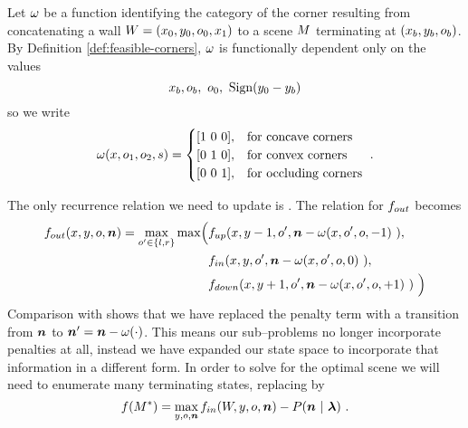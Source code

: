 Let $\CategoryFunc$ be a function identifying the
category of the corner resulting from concatenating a wall
$\Wall=(x_0,y_0,\WallOrient_0,x_1)$ to a scene $\Scene$ terminating at
$(x_b,y_b,\WallOrient_b)$. By Definition \ref{def:feasible-corners},
$\CategoryFunc$ is functionally dependent only on the values
\begin{equation}
  x_b, \WallOrient_b, ~\WallOrient_0, ~\sign(y_0-y_b)
\end{equation}
so we write
\begin{equation}
  \CategoryFunc(x,\WallOrient_1,\WallOrient_2,s) =
  \begin{cases}
    [1 ~ 0 ~ 0], & \mbox{for concave corners}\\
    [0 ~ 1 ~ 0], & \mbox{for convex corners}\\
    [0 ~ 0 ~ 1], & \mbox{for occluding corners}\\
  \end{cases}~.
\end{equation}

The only recurrence relation we need to update is
. The relation for $\SubProbOUT$ becomes
\begin{equation}
  \begin{split}
    \label{eq:fout-recurrence-aug}
    \SubProbOUT(x,y,\WallOrient,\Counts) = 
    \max_{\WallOrient'\in\{l,r\}} \max \Bigl(
      &\SubProbUP(x,y-1,\WallOrient', 
        \Counts-\CategoryFunc(x,\WallOrient',\WallOrient,-1)~),\\
      &\SubProbIN(x,y,\WallOrient',
        \Counts-\CategoryFunc(x,\WallOrient',\WallOrient,0)~),\\
      &\SubProbDOWN(x,y+1,\WallOrient',
        \Counts-\CategoryFunc(x,\WallOrient',\WallOrient,+1)~)~
    \Bigr)
  \end{split}
\end{equation}
Comparison with  shows that we have replaced
the penalty term with a transition from $\Counts$ to
$\Counts'=\Counts-\CategoryFunc(\cdot)$. This means our sub--problems
no longer incorporate penalties at all, instead we have expanded our
state space to incorporate that information in a different form. In
order to solve for the optimal scene we will need to enumerate many
terminating states, replacing  by
\begin{equation}
  \label{eq:opt-entry-point2}
  \Objective(\OptimalScene) = 
  \max_{y,\WallOrient,\Counts}
    \SubProbIN(\Width,y,\WallOrient,\Counts) -
    P(\Counts~|~\Penalties)
  ~.
\end{equation}

